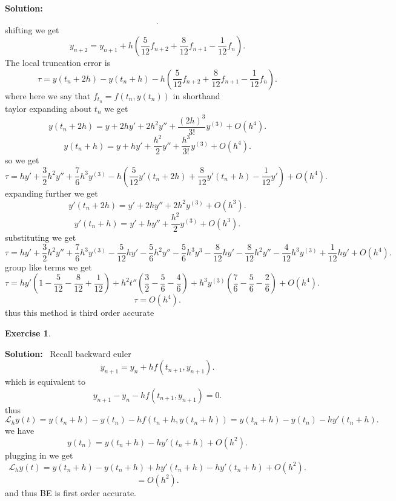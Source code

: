 \documentclass[a4paper,12pt]{scrartcl} %
\newenvironment{solution}
  {\par\color{answercolor}\textbf{Solution:}\ }
  {\par}
\newcounter{customcounter}
\theoremstyle{darktheorem}
\newtheorem{exercise}[customcounter]{Exercise}
\begin{document}
\begin{solution}
\begin{enumerate}
\[            .\] 
            shifting we get
            \[
                y_{n+2} = y_{n+1} + h(\frac{5}{12}f_{n+2} + \frac{8}{12}f_{n+1} - \frac{1}{12}f_n)
            .\] 
            The local truncation error is
            \[
                \tau = y(t_n + 2h) - y(t_n + h) - h(\frac{5}{12}f_{n+2} + \frac{8}{12}f_{n+1} - \frac{1}{12}f_n)
            .\] 
            where here we say that $f_{t_n} = f(t_n, y(t_n))$ in shorthand\\
            taylor expanding about $t_n$ we get
             \[
            y(t_n+2h) = y + 2hy' + 2h^2y'' + \frac{(2h)^{3}}{3!}y^{(3)} + O(h^{4})
            .\] 
            \[
            y(t_n + h) = y + hy' + \frac{h^2}{2}y'' + \frac{h^{3}}{3!}y^{(3)} + O(h^{4})
            .\] 
            so we get
            \[
                \tau = hy' + \frac{3}{2}h^2y'' + \frac{7}{6}h^{3}y^{(3)} - h(\frac{5}{12}y'(t_n+2h) + \frac{8}{12}y'(t_n+h) - \frac{1}{12}y') + O(h^{4})
            .\] 
            expanding further we get
            \[
            y'(t_n + 2h) = y' + 2hy'' + 2h^2y^{(3)} + O(h^{3})
            .\] 
            \[
            y'(t_n + h) = y' + hy'' + \frac{h^2}{2}y^{(3)} + O(h^{3})
            .\] 
            substituting we get
            \[
                \tau = hy' + \frac{3}{2}h^2y'' + \frac{7}{6}h^{3}y^{(3)} - \frac{5}{12}hy' - \frac{5}{6}h^2y'' - \frac{5}{6}h^{3}y^{3} - \frac{8}{12}hy' - \frac{8}{12}h^2y'' - \frac{4}{12}h^{3}y^{(3)} + \frac{1}{12}hy' + O(h^{4})
            .\] 
            group like terms we get
            \[
            \tau = hy'(1 - \frac{5}{12} - \frac{8}{12} + \frac{1}{12}) + h^2t''(\frac{3}{2} - \frac{5}{6} - \frac{4}{6}) + h^{3}y^{(3)}(\frac{7}{6} - \frac{5}{6} - \frac{2}{6}) + O(h^{4})
            .\] 
            \[
            \tau = O(h^{4})
            .\] 
            thus this method is third order accurate
    \end{enumerate}
\end{solution}
\begin{exercise}
    
\end{exercise}
\begin{solution}
    Recall backward euler
    \[
        y_{n+1} = y_n + hf(t_{n+1},y_{n+1})
    .\] 
    which is equivalent to
    \[
        y_{n+1} - y_n - hf(t_{n+1},y_{n+1}) = 0
    .\] 
    thus
    \[
        \mathcal{L}_hy(t) = y(t_n + h) - y(t_n) - hf(t_n + h, y(t_n + h))= y(t_n + h) -y(t_n) - hy'(t_n + h)
    .\] 
    we have
    \[
    y(t_n) = y(t_n + h) - hy'(t_n + h) + O(h^2)
    .\] 
    plugging in we get
    \[
        \mathcal{L}_hy(t) = y(t_n + h) - y(t_n + h) + hy'(t_n+h) - hy'(t_n + h) + O(h^2)
    .\] 
    \[
     = O(h^2)
    .\] 
    and thus BE is first order accurate.
\end{solution}
\end{document}

